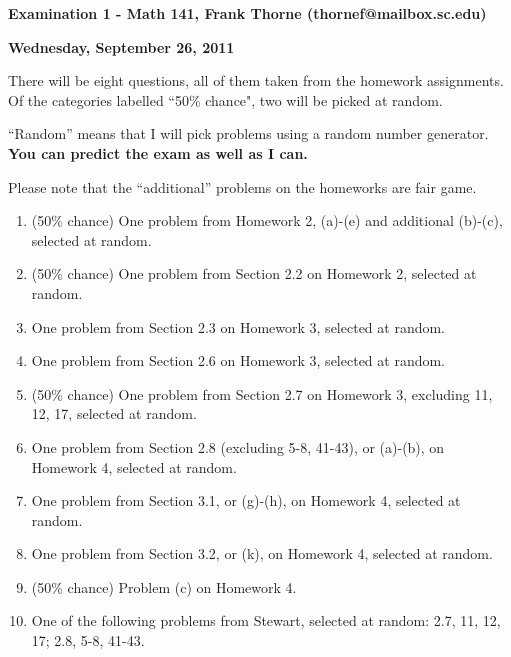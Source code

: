 \documentclass[12pt]{article}
\begin{document}
\setlength{\topmargin}{-2mm}





\begin{center}{\bf Examination 1 - Math 141, Frank Thorne (thornef@mailbox.sc.edu)}
\end{center}
\begin{center}
{\bf Wednesday, September 26, 2011}
\end{center}

There will be eight questions, all of them taken from the homework
assignments. Of the categories labelled ``50\% chance", two will be picked
at random.

``Random'' means that I will pick problems using a random number generator.
{\bf You can predict the exam as well as I can.}

Please note that the ``additional'' problems on the homeworks are fair game.

\begin{enumerate}[(1)]
\item
(50\% chance) One problem from Homework 2, (a)-(e) and additional (b)-(c), selected
at random.

\item
(50\% chance) One problem from Section 2.2 on Homework 2, selected at random.

\item
One problem from Section 2.3 on Homework 3, selected at random.

\item
One problem from Section 2.6 on Homework 3, selected at random.

\item
(50\% chance) One problem from Section 2.7 on Homework 3, excluding 11, 12, 17, selected at random.

\item
One problem from Section 2.8 (excluding 5-8, 41-43), or (a)-(b), on Homework 4, selected at random.

\item
One problem from Section 3.1, or (g)-(h), on Homework 4, selected at random.

\item
One problem from Section 3.2, or (k), on Homework 4, selected at random.

\item
(50\% chance) Problem (c) on Homework 4.

\item
One of the following problems from Stewart, selected at random:
2.7, 11, 12, 17; 2.8, 5-8, 41-43.

\end{enumerate}
\end{document}
